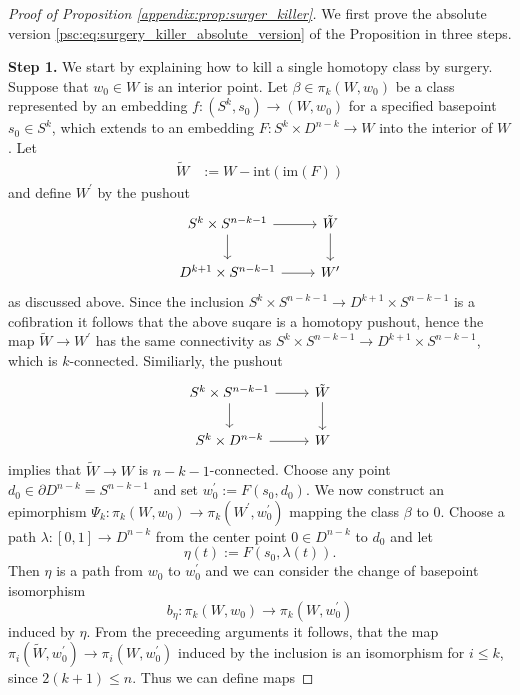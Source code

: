 \begin{proof}[Proof of Proposition \ref{appendix:prop:surger_killer}]
    We first prove the absolute version \ref{psc:eq:surgery_killer_absolute_version} of the Proposition in three steps. \vspace{-.5em}

    \noindent \textbf{Step 1.} We start by explaining how to kill a single homotopy class by surgery. Suppose that $w_0 \in W$ is an interior point. Let $\beta \in \pi_k(W,w_0)$ be a class represented by an embedding $f \colon (S^k,s_0) \to (W,w_0)$ for a specified basepoint $s_0 \in S^k$, which extends to an embedding $F \colon S^k \times D^{n-k} \to W$ into the interior of $W$. Let 
    \begin{align*}
        \tilde{W} &:= W - \mathrm{int}(\mathrm{im}(F))
    \end{align*}
    and define $W^\prime$ by the pushout
    \[\begin{tikzcd}
	{S^k \times S^{n-k-1}} & {\tilde{W}} \\
	{D^{k+1} \times S^{n-k-1}} & {W^\prime}
	\arrow[from=1-1, to=1-2]
	\arrow[from=1-1, to=2-1]
	\arrow[from=1-2, to=2-2]
	\arrow[from=2-1, to=2-2]
    \end{tikzcd}\]
    as discussed above. Since the inclusion $S^k \times S^{n-k-1} \to D^{k+1} \times S^{n-k-1}$ is a cofibration it follows that the above suqare is a homotopy pushout, hence the map $\tilde{W} \to W^\prime$ has the same connectivity as $S^k \times S^{n-k-1} \to D^{k+1} \times S^{n-k-1}$, which is $k$-connected. Similiarly, the pushout 
    \[\begin{tikzcd}
	{S^k \times S^{n-k-1}} & {\tilde{W}} \\
	{S^k \times D^{n-k}} & W
	\arrow[from=1-1, to=1-2]
	\arrow[from=1-1, to=2-1]
	\arrow[from=1-2, to=2-2]
	\arrow[from=2-1, to=2-2]
    \end{tikzcd}\]
    implies that $\tilde{W} \to W$ is $n-k-1$-connected. Choose any point $d_0 \in \partial D^{n-k} = S^{n-k-1}$ and set $w_0^\prime := F(s_0,d_0)$. We now construct an epimorphism $\Psi_k \colon \pi_k(W,w_0) \to \pi_k(W^\prime,w_0^\prime)$ mapping the class $\beta$ to $0$. Choose a path $\lambda \colon [0,1] \to D^{n-k}$ from the center point $0 \in D^{n-k}$ to $d_0$ and let
    \[
    \eta(t) := F(s_0,\lambda(t)).
    \]
    Then $\eta$ is a path from $w_0$ to $w_0^\prime$ and we can consider the change of basepoint isomorphism
    \[
    b_\eta \colon \pi_k(W,w_0) \to \pi_k(W,w_0^\prime)
    \]
    induced by $\eta$. From the preceeding arguments it follows, that the map $\pi_i(\tilde{W},w_0^\prime) \to \pi_i(W,w_0^\prime)$ induced by the inclusion is an isomorphism for $i \leq k$, since $2(k+1) \leq n$. Thus we can define maps

\end{proof}
